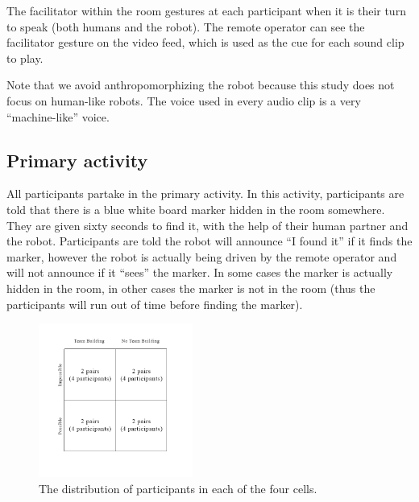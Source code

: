 \documentclass{acm_proc_article-sp}
\begin{document}
The facilitator within the room gestures at each participant when it is their turn to speak (both humans and the robot). The remote operator can see the facilitator gesture on the video feed, which is used as the cue for each sound clip to play.

Note that we avoid anthropomorphizing the robot because this study does not focus on human-like robots. The voice used in every audio clip is a very ``machine-like'' voice.
\subsection{Primary activity}
\label{section:primary-activity}
All participants partake in the primary activity. In this activity, participants are told that there is a blue white board marker hidden in the room somewhere. They are given sixty seconds to find it, with the help of their human partner and the robot. Participants are told the robot will announce ``I found it'' if it finds the marker, however the robot is actually being driven by the remote operator and will not announce if it ``sees'' the marker. In some cases the marker is actually hidden in the room, in other cases the marker is not in the room (thus the participants will run out of time before finding the marker). 

\begin{figure}[here]
\includegraphics[width=0.45\textwidth]{participants.png}
\caption{The distribution of participants in each of the four cells.}
\label{fig:participantdistro}
\end{figure}
\end{document}
